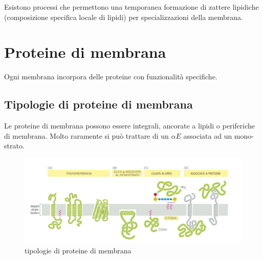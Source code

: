         Esistono processi che permettono una temporanea formazione di zattere lipidiche (composizione specifica locale di lipidi) per specializzazioni della membrana.\\
    
\section{Proteine di membrana}
    \small
    Ogni membrana incorpora delle proteine con funzionalità specifiche.
    \subsection{Tipologie di proteine di membrana}
        Le proteine di membrana possono essere integrali, ancorate a lipidi o periferiche di membrana. Molto raramente si può trattare di un $\alpha E$ associata ad un mono-strato.
        
         \begin{figure}[h]
            \centering
            \includegraphics[width=1\textwidth]{images/proteinemembrana.JPG}
            \caption{\small tipologie di proteine di membrana}
            \label{fig:mesh1}
        \end{figure}
        
